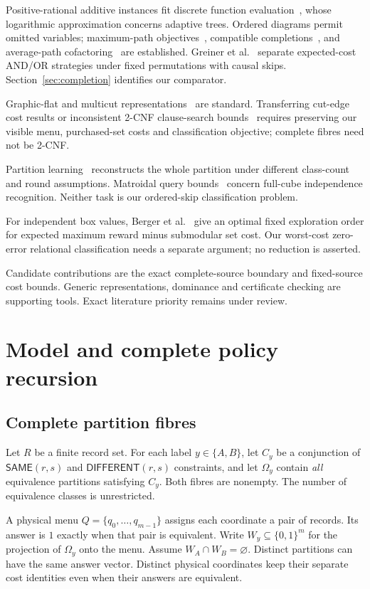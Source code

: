 \documentclass[pdflatex,sn-mathphys-num]{sn-jnl}
\newcommand{\SAME}{\mathsf{SAME}}
\newcommand{\DIFF}{\mathsf{DIFFERENT}}
\theoremstyle{thmstyleone}
\theoremstyle{thmstylethree}
\theoremstyle{thmstyletwo}
\begin{document}
Positive-rational additive instances fit discrete function evaluation~\cite{cicalese14}, whose logarithmic approximation concerns adaptive trees. Ordered diagrams permit omitted variables; maximum-path objectives~\cite{ebendt06,ebendt05}, compatible completions~\cite{oliveira,sasao}, and average-path cofactoring~\cite{jiang} are established. Greiner et al.~\cite{greiner} separate expected-cost AND/OR strategies under fixed permutations with causal skips. Section~\ref{sec:completion} identifies our comparator.

Graphic-flat and multicut representations~\cite{berczi,hornakova} are standard. Transferring cut-edge cost results or inconsistent 2-CNF clause-search bounds~\cite{lovasz} requires preserving our visible menu, purchased-set costs and classification objective; complete fibres need not be 2-CNF.

Partition learning~\cite{liu,black} reconstructs the whole partition under different class-count and round assumptions. Matroidal query bounds~\cite{kulkarni} concern full-cube independence recognition. Neither task is our ordered-skip classification problem.

For independent box values, Berger et al.~\cite{pandora} give an optimal fixed exploration order for expected maximum reward minus submodular set cost. Our worst-cost zero-error relational classification needs a separate argument; no reduction is asserted.

Candidate contributions are the exact complete-source boundary and fixed-source cost bounds. Generic representations, dominance and certificate checking are supporting tools. Exact literature priority remains under review.


\section{Model and complete policy recursion}
\subsection{Complete partition fibres}
Let $R$ be a finite record set. For each label $y\in\{A,B\}$, let $C_y$ be a conjunction of $\SAME(r,s)$ and $\DIFF(r,s)$ constraints, and let $\Omega_y$ contain \emph{all} equivalence partitions satisfying $C_y$. Both fibres are nonempty. The number of equivalence classes is unrestricted.

A physical menu $Q=\{q_0,\ldots,q_{m-1}\}$ assigns each coordinate a pair of records. Its answer is $1$ exactly when that pair is equivalent. Write $W_y\subseteq\{0,1\}^m$ for the projection of $\Omega_y$ onto the menu. Assume $W_A\cap W_B=\varnothing$. Distinct partitions can have the same answer vector. Distinct physical coordinates keep their separate cost identities even when their answers are equivalent.
\end{document}
